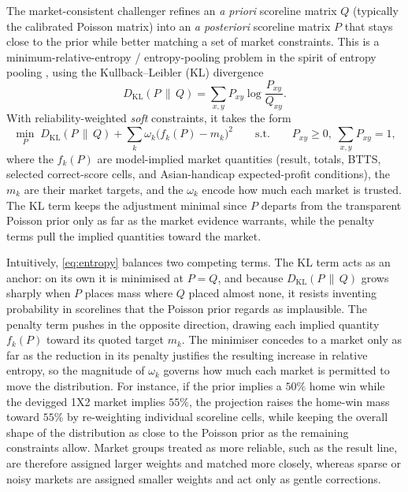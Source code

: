 \documentclass[11pt]{article}
\newcommand{\KL}{D_{\mathrm{KL}}}
\begin{document}
The market-consistent challenger refines an \textit{a priori} scoreline matrix $Q$ (typically the calibrated Poisson matrix) into an \textit{a posteriori} scoreline matrix $P$ that stays close to the prior while better matching a set of market constraints. This is a minimum-relative-entropy / entropy-pooling problem in the spirit of entropy pooling \cite{meucci2008}, using the Kullback--Leibler (KL) divergence \cite{kullbackleibler1951}
\[
\KL(P\,\|\,Q)=\sum_{x,y}P_{xy}\log\frac{P_{xy}}{Q_{xy}} .
\]
With reliability-weighted \textit{soft} constraints, it takes the form
\begin{equation}
\min_{P}\;
\KL(P\,\|\,Q)
+\sum_{k}\omega_k\big(f_k(P)-m_k\big)^2
\qquad\text{s.t.}\qquad
P_{xy}\ge 0,\;\sum_{x,y}P_{xy}=1,
\label{eq:entropy}
\end{equation}
where the $f_k(P)$ are model-implied market quantities (result, totals, BTTS, selected
correct-score cells, and Asian-handicap expected-profit conditions), the $m_k$ are their
market targets, and the $\omega_k$ encode how much each market is trusted. The KL term keeps the adjustment minimal since $P$ departs from the transparent Poisson prior only as far as the market evidence warrants, while the penalty terms pull the implied quantities toward the market.

Intuitively, \eqref{eq:entropy} balances two competing terms. The KL term acts as
an anchor: on its own it is minimised at $P=Q$, and because $\KL(P\,\|\,Q)$ grows sharply when $P$
places mass where $Q$ placed almost none, it resists inventing probability in scorelines that the
Poisson prior regards as implausible. The penalty term pushes in the opposite direction, drawing
each implied quantity $f_k(P)$ toward its quoted target $m_k$. The minimiser concedes to a market
only as far as the reduction in its penalty justifies the resulting increase in relative entropy,
so the magnitude of $\omega_k$ governs how much each market is permitted to move the distribution.
For instance, if the prior implies a $50\%$ home win while the devigged 1X2 market implies $55\%$,
the projection raises the home-win mass toward $55\%$ by re-weighting individual scoreline cells, while keeping the overall shape of the distribution as close to the Poisson prior as the remaining constraints allow. Market groups treated as more reliable, such as the result line, are therefore assigned larger weights and matched more closely, whereas sparse or noisy markets are assigned smaller weights and act only as gentle corrections.
\end{document}

